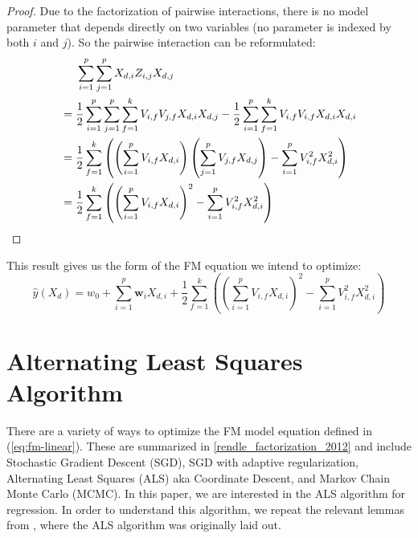 \documentclass[10pt]{journal}
\newtheorem{proof}{Proof}
\begin{document}
\begin{proof}
    Due to the factorization of pairwise interactions, there is no model
    parameter that depends directly on two variables (no parameter is indexed by
    both $i$ and $j$). So the pairwise interaction can be reformulated:
    \begin{align}
        & \hphantom{==  } \begin{aligned}[t]
            \sum_{i=1}^p \sum_{j=1}^p X_{d,i} Z_{i,j} X_{d,j}  \\
        \end{aligned} \\
        &= \begin{aligned}[t]
            \frac{1}{2}\sum_{i=1}^p \sum_{j=1}^p \sum_{f=1}^k
                V_{i,f} V_{j,f} X_{d,i} X_{d,j} -
            \frac{1}{2}\sum_{i=1}^p \sum_{f=1}^k V_{i,f} V_{i,f} X_{d,i} X_{d,i}
        \end{aligned} \\
        &= \begin{aligned}[t]
            \frac{1}{2} \sum_{f=1}^k \left(
                \left(\sum_{i=1}^p V_{i,f} X_{d,i}\right)
                \left(\sum_{j=1}^p V_{j,f} X_{d,j}\right) -
                \sum_{i=1}^p V_{i,f}^2 X_{d,i}^2
            \right)
        \end{aligned} \\
        &= \begin{aligned}[t]
            \frac{1}{2} \sum_{f=1}^k \left(
                \left(\sum_{i=1}^p V_{i,f} X_{d,i}\right)^2 -
                \sum_{i=1}^p V_{i,f}^2 X_{d,i}^2
            \right)
        \end{aligned}
    \end{align}
\end{proof}
%
This result gives us the form of the FM equation we intend to optimize:
%
\begin{equation} \label{eq:fm-linear}
    \hat{y}(X_d) = w_0 + \sum_{i=1}^p \bm{w}_i X_{d,i} +
        \frac{1}{2} \sum_{f=1}^k \left(
            \left(\sum_{i=1}^p V_{i,f} X_{d,i}\right)^2 -
            \sum_{i=1}^p V_{i,f}^2 X_{d,i}^2
        \right)
\end{equation}


\section{Alternating Least Squares Algorithm}

There are a variety of ways to optimize the FM model equation defined in
(\ref{eq:fm-linear}). These are summarized in \ref{rendle_factorization_2012}
and include Stochastic Gradient Descent (SGD), SGD with adaptive regularization,
Alternating Least Squares (ALS) aka Coordinate Descent, and Markov Chain Monte
Carlo (MCMC). In this paper, we are interested in the ALS algorithm for
regression. In order to understand this algorithm, we repeat the relevant lemmas
from \cite{rendle_fast_2011}, where the ALS algorithm was originally laid out.
\end{document}
